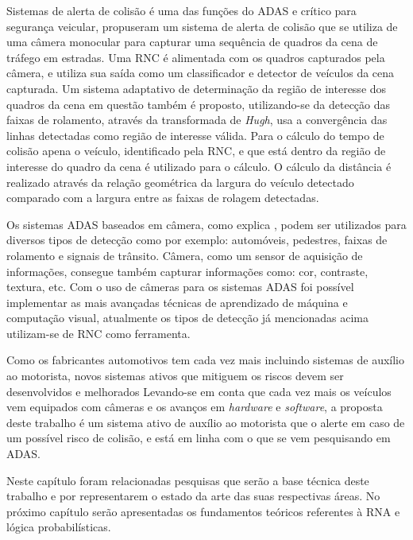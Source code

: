 \documentclass[
	12pt,				%
    oneside,			%
	a4paper,			%
	english,			%
	french,				%
	spanish,			%
	brazil,				%
	]{abntex2}
\begin{document}
Sistemas de alerta de colisão é uma das funções do ADAS e crítico para segurança veicular,  propuseram um sistema de alerta de colisão que se utiliza de uma câmera monocular para capturar uma sequência de quadros da cena de tráfego em estradas. Uma RNC é alimentada com os quadros capturados pela câmera, e utiliza sua saída como um classificador e detector de veículos da cena capturada. Um sistema adaptativo de determinação da região de interesse dos quadros da cena em questão também é proposto, utilizando-se da detecção das faixas de rolamento, através da transformada de \textit{Hugh}, usa a convergência das linhas detectadas como região de interesse válida. Para o cálculo do tempo de colisão apena o veículo, identificado pela RNC, e que está dentro da região de interesse do quadro da cena é utilizado para o cálculo. O cálculo da distância é realizado através da relação geométrica da largura do veículo detectado comparado com a largura entre as faixas de rolagem detectadas.

Os sistemas ADAS baseados em câmera, como explica , podem ser utilizados para diversos tipos de detecção como por exemplo: automóveis, pedestres, faixas de rolamento e signais de trânsito. Câmera, como um sensor de aquisição de informações, consegue também capturar informações como: cor, contraste, textura, etc. Com o uso de câmeras para os sistemas ADAS foi possível implementar as mais avançadas técnicas de aprendizado de máquina e computação visual, atualmente os tipos de detecção já mencionadas acima utilizam-se de RNC como ferramenta.

Como os fabricantes automotivos tem cada vez mais incluindo sistemas de auxílio ao motorista, novos sistemas ativos que mitiguem os riscos devem ser desenvolvidos e melhorados Levando-se em conta que cada vez mais os veículos vem equipados com câmeras e os avanços em \textit{hardware} e \textit{software}, a proposta deste trabalho é um sistema ativo de auxílio ao motorista que o alerte em caso de um possível risco de colisão, e está em linha com o que se vem pesquisando em ADAS.

Neste capítulo foram relacionadas pesquisas que serão a base técnica deste trabalho e por representarem o estado da arte das suas respectivas áreas. No próximo capítulo serão apresentadas os fundamentos teóricos referentes à RNA e lógica probabilísticas.




\end{document}
